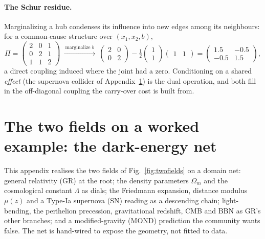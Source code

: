 \documentclass[11pt]{article}
\begin{document}
\paragraph{The Schur residue.} Marginalizing a hub condenses its influence into new edges among its
neighbours: for a common-cause structure over $(x_1,x_2,b)$,
\begin{equation}
\Pi=\begin{pmatrix}2&0&1\\0&2&1\\1&1&2\end{pmatrix}
\ \xrightarrow{\ \text{marginalize } b\ }\
\begin{pmatrix}2&0\\0&2\end{pmatrix}-\tfrac12\begin{pmatrix}1\\1\end{pmatrix}\begin{pmatrix}1&1\end{pmatrix}
=\begin{pmatrix}1.5&-0.5\\-0.5&1.5\end{pmatrix},
\label{eq:schur}
\end{equation}
a direct coupling induced where the joint had a zero. Conditioning on a shared \emph{effect} (the
supernova collider of Appendix~\ref{app:darkenergy}) is the dual operation, and both fill in the
off-diagonal coupling the carry-over cost is built from.



\section{The two fields on a worked example: the dark-energy net}
\label{app:darkenergy}

This appendix realises the two fields of Fig.~\ref{fig:twofields} on a domain net: general
relativity (GR) at the root; the density parameters $\Omega_m$ and the cosmological constant
$\Lambda$ as dials; the Friedmann expansion, distance modulus $\mu(z)$ and a Type-Ia supernova (SN)
reading as a descending chain; light-bending, the perihelion precession, gravitational redshift, CMB
and BBN as GR's other branches; and a modified-gravity (MOND) prediction the community wants false.
The net is hand-wired to expose the geometry, not fitted to data.
\end{document}
